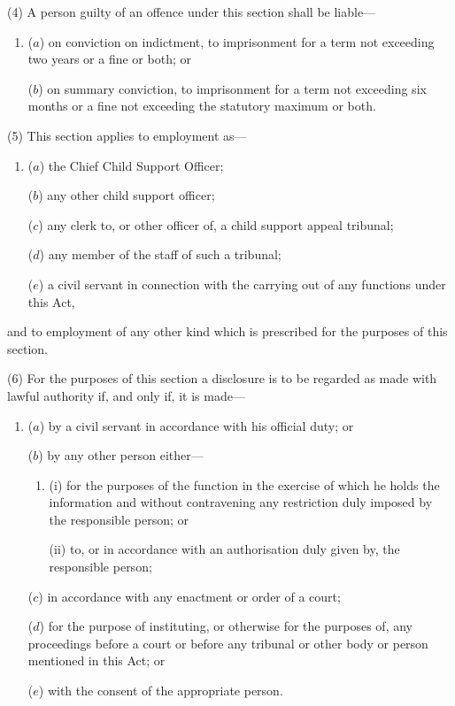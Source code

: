 \documentclass[12pt,a4paper]{article}
\begin{document}
(4) A person guilty of an offence under this section shall be liable—
\begin{enumerate}\item[]
($a$) on conviction on indictment, to imprisonment for a term not exceeding two years or a fine or both; or

($b$) on summary conviction, to imprisonment for a term not exceeding six months or a fine not exceeding the statutory maximum or both.
\end{enumerate}

(5) This section applies to employment as—
\begin{enumerate}\item[]
($a$) the Chief Child Support Officer;

($b$) any other child support officer;

($c$) any clerk to, or other officer of, a child support appeal tribunal;

($d$) any member of the staff of such a tribunal;

($e$) a civil servant in connection with the carrying out of any functions under this Act,
\end{enumerate}
and to employment of any other kind which is prescribed for the purposes of this section.

(6) For the purposes of this section a disclosure is to be regarded as made with lawful authority if, and only if, it is made—
\begin{enumerate}\item[]
($a$) by a civil servant in accordance with his official duty; or

($b$) by any other person either—
\begin{enumerate}\item[]
(i) for the purposes of the function in the exercise of which he holds the information and without contravening any restriction duly imposed by the responsible person; or

(ii) to, or in accordance with an authorisation duly given by, the responsible person;
\end{enumerate}

($c$) in accordance with any enactment or order of a court;

($d$) for the purpose of instituting, or otherwise for the purposes of, any proceedings before a court or before any tribunal or other body or person mentioned in this Act; or

($e$) with the consent of the appropriate person.
\end{enumerate}
\end{document}
